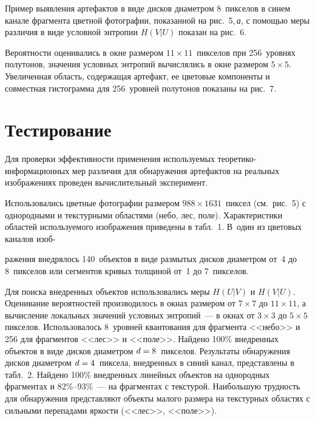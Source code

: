\begin{multicols}{2}

  Пример выявления артефактов в виде дисков диаметром 8~пикселов в синем канале 
фрагмента цветной фотографии, показанной на рис.~5,\,\textit{а}, с помощью меры различия 
в виде условной энтропии
 $H(V\vert U)$ показан на рис.~6. 
 
 Вероятности оценивались в окне 
размером $11\times 11$~пикселов при 256~уровнях полутонов, значения условных энтропий 
вы\-чис\-ля\-лись в окне размером $5\times 5$. Увеличенная область, содержащая артефакт, ее 
цветовые компоненты и совместная гистограмма для 256~уровней полутонов показаны на 
рис.~7.


\section{Тестирование}

\vspace*{-15pt}

  Для проверки эффективности применения используемых теоретико-информационных мер 
различия для обнаружения артефактов на реальных изображениях проведен вычислительный 
эксперимент. 

Использовались цветные фотографии размером $988\times 1631$~пиксел (см.\ 
рис.~5) с однородными и текстурными областями (небо, лес, поле). Характеристики областей 
используемого изображения приведены в табл.~1. В~один из цветовых каналов
изоб-\linebreak\vspace*{-12pt}
\pagebreak

\noindent
ражения 
внедрялось 140~объектов в виде размытых дисков диаметром от~4 до 8~пикселов или 
сегментов кривых толщиной от~1 до 7~пикселов. 
  
  Для поиска внедренных объектов использовались меры $H(U\vert V)$ и $H(V\vert U)$. 
Оценивание вероятностей производилось в окнах размером от $7\times 7$ до $11\times 11$, а 
вычисление локальных значений условных энтропий~--- в окнах от $3\times 3$ до $5\times 5$ 
пикселов. Использовалось 8~уровней квантования для фрагмента <<небо>> и 256 для 
фрагментов <<лес>> и <<поле>>. Найдено 100\% внедренных объектов в виде дисков 
диаметром $d \hm= 8$~пикселов. Результаты обнаружения дисков диаметром $d\hm = 
4$~пиксела, внедренных в синий канал, представлены в табл.~2. Найдено 100\% внедренных 
линейных объектов на однородных фрагментах и 82\%--93\%~--- на фрагментах с текстурой. 
Наибольшую трудность для обнаружения представляют объекты малого размера на 
текстурных областях с сильными перепадами яркости (<<лес>>, <<поле>>).


\end{multicols}
